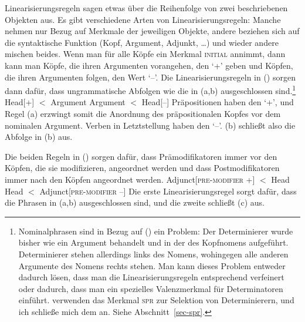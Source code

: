 Linearisierungsregeln sagen etwas über die Reihenfolge von zwei beschriebenen Objekten aus.
Es gibt verschiedene Arten von Linearisierungsregeln: Manche nehmen nur Bezug auf Merkmale der jeweiligen
Objekte, andere beziehen sich auf die syntaktische Funktion (Kopf, Argument, Adjunkt, \ldots) und
wieder andere mischen beides.
Wenn man für alle Köpfe ein Merkmal \textsc{initial} annimmt, dann kann man Köpfe,
die ihren Argumenten vorangehen, den \initialw `+' geben und Köpfen, die ihren Argumenten folgen,
den Wert `--'. Die Linearisierungsregeln in () sorgen dann dafür, dass ungrammatische
Abfolgen wie die in (a,b) ausgeschlossen sind.\footnote{
  Nominalphrasen sind in Bezug auf () ein Problem: Der Determinierer wurde bisher wie
  ein Argument behandelt und in der \compsl des Kopfnomens aufgeführt. Determinierer stehen allerdings
  links des Nomens, wohingegen alle anderen Argumente des Nomens rechts stehen. Man kann dieses Problem
  entweder dadurch lösen, dass man die Linearisierungsregeln entsprechend verfeinert oder dadurch,
  dass man ein spezielles Valenzmerkmal für Determinatoren einführt. \citet[Abschnitt~9.4]{ps2} verwenden
  das Merkmal \textsc{spr} zur Selektion von Determinierern, und ich schließe
  mich dem an. Siehe Abschnitt~\ref{sec-spr}.%
}
\eal
\ex\label{lp-ini-arg} Head[\initial+] $<$ Argument
\ex Argument $<$ Head[\initial --]
\zl
Präpositionen haben den \initialw `+', und Regel (a) erzwingt somit die Anordnung des präpositionalen
Kopfes vor dem nominalen Argument. Verben in Letztstellung haben den \initialw `--'. (b) schließt
also die Abfolge in (b) aus.

Die beiden Regeln in () sorgen dafür, dass Prämodifikatoren immer vor den Köpfen, die sie modifizieren,
angeordnet werden und dass Postmodifikatoren immer nach den Köpfen angeordnet werden.
\eal
\label{lp-head-argument-initial}
\ex Adjunct[\textsc{pre-modifier} +] $<$ Head
\ex Head $<$ Adjunct[\textsc{pre-modifier} --]
\zl
Die erste Linearisierungsregel sorgt dafür, dass die Phrasen in (a,b) ausgeschlossen sind, und die zweite
schließt (c) aus.

